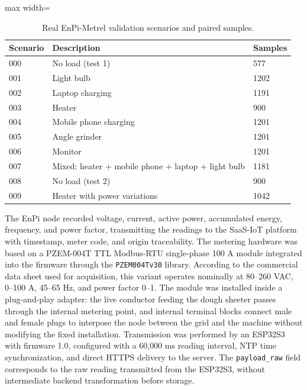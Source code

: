\documentclass{ieeeaccess}
\begin{document}
\begin{table}[H]
\caption{Real EnPi-Metrel validation scenarios and paired samples.}
\label{tab:escenarios-reales-de-validacion-de-enpi-metre}
\centering
\begin{adjustbox}{max width=\columnwidth}
\begin{tabular}{p{}p{}p{}}
\toprule
Scenario & Description & Samples \\
\midrule
000 & No load (test 1) & 577 \\
001 & Light bulb & 1202 \\
002 & Laptop charging & 1191 \\
003 & Heater & 900 \\
004 & Mobile phone charging & 1201 \\
005 & Angle grinder & 1201 \\
006 & Monitor & 1201 \\
007 & Mixed: heater + mobile phone + laptop + light bulb & 1181 \\
008 & No load (test 2) & 900 \\
009 & Heater with power variations & 1042 \\
\bottomrule
\end{tabular}
\end{adjustbox}
\end{table}

The EnPi node recorded voltage, current, active power, accumulated energy, frequency, and power factor, transmitting the readings to the SaaS-IoT platform with timestamp, meter code, and origin traceability. The metering hardware was based on a PZEM-004T TTL Modbus-RTU single-phase 100 A module integrated into the firmware through the \texttt{PZEM004Tv30} library. According to the commercial data sheet used for acquisition, this variant operates nominally at 80--260 VAC, 0--100 A, 45--65 Hz, and power factor 0--1. The module was installed inside a plug-and-play adapter: the live conductor feeding the dough sheeter passes through the internal metering point, and internal terminal blocks connect male and female plugs to interpose the node between the grid and the machine without modifying the fixed installation. Transmission was performed by an ESP32S3 with firmware 1.0, configured with a 60,000 ms reading interval, NTP time synchronization, and direct HTTPS delivery to the server. The \texttt{payload\_raw} field corresponds to the raw reading transmitted from the ESP32S3, without intermediate backend transformation before storage.
\end{document}
